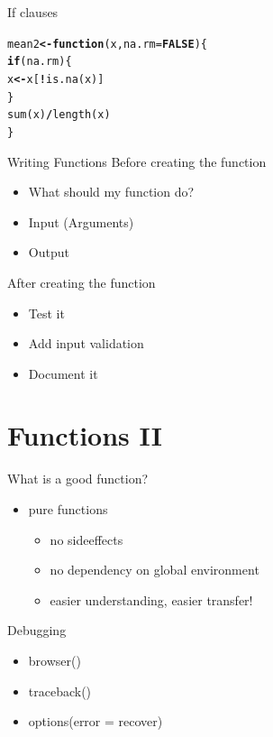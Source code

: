 \documentclass{beamer}\usepackage[]{graphicx}\usepackage[]{color}
\makeatletter
\newcommand{\hlnum}[1]{\textcolor[rgb]{0.502,0,0.502}{\textbf{#1}}}%
\newcommand{\hlopt}[1]{\textcolor[rgb]{1,0,0.502}{\textbf{#1}}}%
\newcommand{\hlstd}[1]{\textcolor[rgb]{0,0,0}{#1}}%
\newcommand{\hlkwa}[1]{\textcolor[rgb]{0.733,0.475,0.467}{\textbf{#1}}}%
\newcommand{\hlkwb}[1]{\textcolor[rgb]{0.502,0.502,0.753}{\textbf{#1}}}%
\newcommand{\hlkwc}[1]{\textcolor[rgb]{0,0.502,0.753}{#1}}%
\newcommand{\hlkwd}[1]{\textcolor[rgb]{0,0.267,0.4}{#1}}%
\newenvironment{kframe}{%
 \def\at@end@of@kframe{}%
 \ifinner\ifhmode%
  \def\at@end@of@kframe{\end{minipage}}%
  \begin{minipage}{\columnwidth}%
 \fi\fi%
 \def\FrameCommand##1{\hskip\@totalleftmargin \hskip-\fboxsep
 \colorbox{shadecolor}{##1}\hskip-\fboxsep
     \hskip-\linewidth \hskip-\@totalleftmargin \hskip\columnwidth}%
 \MakeFramed {\advance\hsize-\width
   \@totalleftmargin\z@ \linewidth\hsize
   \@setminipage}}%
 {\par\unskip\endMakeFramed%
 \at@end@of@kframe}
\makeatother
\begin{document}
\begin{frame}[fragile]{If clauses}
\begin{kframe}
\begin{alltt}
\hlstd{mean2} \hlkwb{<-} \hlkwa{function}\hlstd{(}\hlkwc{x}\hlstd{,} \hlkwc{na.rm} \hlstd{=} \hlnum{FALSE}\hlstd{) \{}
  \hlkwa{if} \hlstd{(na.rm)\{}
    \hlstd{x} \hlkwb{<-} \hlstd{x[}\hlopt{!}\hlkwd{is.na}\hlstd{(x)]}
  \hlstd{\}}
  \hlkwd{sum}\hlstd{(x)}\hlopt{/}\hlkwd{length}\hlstd{(x)}
\hlstd{\}}
\end{alltt}
\end{kframe}
\end{frame}


\begin{frame}{Writing Functions}
  Before creating the function
  \begin{itemize}
    \item What should my function do?
    \item Input (Arguments)
    \item Output
  \end{itemize}
  After creating the function
  \begin{itemize}
    \item Test it
    \item Add input validation
    \item Document it
  \end{itemize}
\end{frame}

\section{Functions II}

\begin{frame}{What is a good function?}
\begin{itemize}
  \item pure functions
  \begin{itemize}
    \item no sideeffects
    \item no dependency on global environment
    \item easier understanding, easier transfer!
  \end{itemize}
\end{itemize}
\end{frame}

\begin{frame}{Debugging}
\begin{itemize}
  \item browser()
  \item traceback()
  \item options(error = recover)
\end{itemize}
\end{frame}
\end{document}
